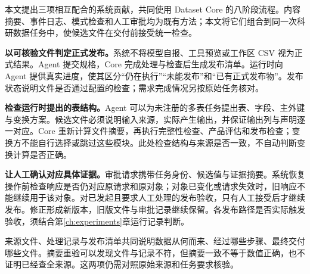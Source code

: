 本文提出三项相互配合的系统贡献，共同使用 Dataset Core 的八阶段流程。内容摘要、事件日志、模式检查和人工审批均为既有方法；本文将它们组合到同一次科研数据任务中，使候选文件在交付前接受统一检查。

\textbf{以可核验文件判定正式发布。}系统不将模型自报、工具预览或工作区 CSV 视为正式结果。Agent 提交规格，Core 完成处理与检查后生成发布清单。运行时向 Agent 提供真实进度，使其区分“仍在执行”“未能发布”和“已有正式发布物”。发布状态说明文件是否通过配置的检查；需求完成情况另按原始任务核对。

\textbf{检查运行时提出的表结构。}Agent 可以为未注册的多表任务提出表、字段、主外键与变换方案。候选文件必须说明输入来源，实际产生输出，并保证输出列与声明逐一对应。Core 重新计算文件摘要，再执行完整性检查、产品评估和发布检查；变换方不能自行选择或跳过这些模块。此处检查结构与来源是否一致，不自动判断变换计算是否正确。

\textbf{让人工确认对应具体证据。}审批请求携带任务身份、候选值与证据摘要。系统恢复操作前检查响应是否仍对应原请求和原对象；对象已变化或请求失效时，旧响应不能继续用于该对象。对已发起且要求人工处理的发布验收，只有人工接受后才继续发布。修正形成新版本，旧版文件与审批记录继续保留。各发布路径是否实际触发验收，须结合第\ref{ch:experiments}章运行记录判断。

来源文件、处理记录与发布清单共同说明数据从何而来、经过哪些步骤、最终交付哪些文件。摘要重验可以发现文件与记录不符，但摘要一致不等于数值正确，也不证明已经查全来源。这两项仍需对照原始来源和任务要求核验。

